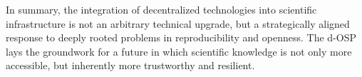 \documentclass[final]{rc-book-2.14}
\begin{document}
In summary, the integration of decentralized technologies into scientific infrastructure is not an arbitrary technical upgrade, but a strategically aligned response to deeply rooted problems in reproducibility and openness. The d-OSP lays the groundwork for a future in which scientific knowledge is not only more accessible, but inherently more trustworthy and resilient.


\backmatter



\end{document}
